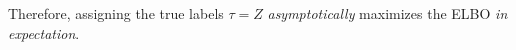 \documentclass[../../main.tex]{subfiles} %
\begin{document}
 Therefore, assigning the true labels \(\tau 
= Z\) \textit{asymptotically} maximizes the ELBO \textit{in expectation}. 

\begin{comment}
	The expected ELBO becomes
\begin{dmath*}
	\mathbb E \left[\mathcal{L}\right \vert Z] = \text{log terms} + \\
	\log (p) \left(\frac{1}{2} \tau^t \mathscr A \tau + \tau^t 
	\bar{\mathscr{A}} 
	\bar \tau + \frac{1}{2} \bar{\tau}^t \mathscr A \bar \tau \right) \\
	\log (q) \left(\frac{1}{2} \tau^t \bar{\mathscr{A}} \tau + \tau^t 
	\mathscr{A}
	\bar \tau + \frac{1}{2} \bar{\tau}^t \bar{\mathscr{A}} \bar \tau \right)
\end{dmath*}
Now, in order to develop this calculation, first develop the quantities
\begin{align*}
	\tau^t B \tau &= p \left(n_{\tau_1} - n_{\tau_2}\right)^2 + 2 n_{\tau_1} 
	n_{\tau_2}, \\
	\tau^t B \bar\tau &=  - \left(n_{\tau_1} - n_{\tau_2}\right)^2 + 
	\left(n_{\tau_1} - n_{\tau_2}\right), \\
	\bar{\tau}^t B \bar\tau &= p \left(\left(n_1 - n_2\right) - 
	\left(n_{\tau_1} - n_{\tau_2}\right)\right)^2 + 2 \left(n_1 - 
	n_{\tau_1}\right)\left(n_2 - n_{\tau_2}\right).\\
\end{align*}
\end{comment}
\end{document}
